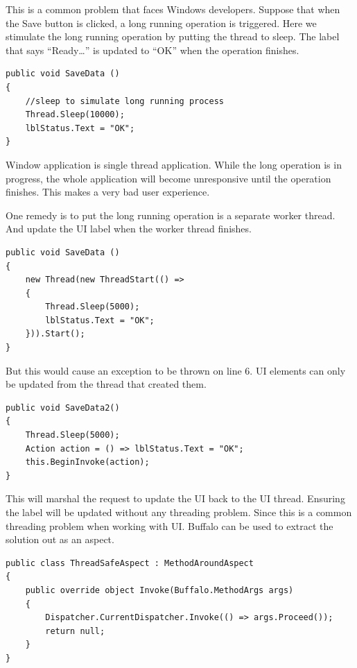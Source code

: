 This is a common problem that faces Windows developers. Suppose that when the Save button is clicked, a long running operation is triggered. Here we stimulate the long running operation by putting the thread to sleep. The label that says “Ready…” is updated to “OK” when the operation finishes.

\begin{lstlisting}[caption={Long running operation}, label=savedata1, frame=tb, basicstyle=\scriptsize]
public void SaveData ()
{
    //sleep to simulate long running process
    Thread.Sleep(10000);
    lblStatus.Text = "OK";
}
\end{lstlisting}

Window application is single thread application. While the long operation is in progress, the whole application will become unresponsive until the operation finishes. This makes a very bad user experience.

One remedy is to put the long running operation is a separate worker thread. And update the UI label when the worker thread finishes.

\begin{lstlisting}[caption={Long running operation with thread}, label=savedata2, frame=tb, basicstyle=\scriptsize]
public void SaveData ()
{
    new Thread(new ThreadStart(() =>
    {
        Thread.Sleep(5000);
        lblStatus.Text = "OK";
    })).Start();
}
\end{lstlisting}

But this would cause an exception to be thrown on line 6. UI elements can only be updated from the thread that created them.

\begin{lstlisting}[caption={Update UI from different thread}, label=savedata3, frame=tb, basicstyle=\scriptsize]
public void SaveData2()
{ 
    Thread.Sleep(5000);
    Action action = () => lblStatus.Text = "OK";
    this.BeginInvoke(action);
}
\end{lstlisting}

This will marshal the request to update the UI back to the UI thread. Ensuring the label will be updated without any threading problem.
Since this is a common threading problem when working with UI. Buffalo can be used to extract the solution out as an aspect.

\begin{lstlisting}[caption={ThreadSafeAspect}, label=savedata4, frame=tb, basicstyle=\scriptsize]
public class ThreadSafeAspect : MethodAroundAspect
{
	public override object Invoke(Buffalo.MethodArgs args)
	{
		Dispatcher.CurrentDispatcher.Invoke(() => args.Proceed());
		return null;
	}
}
\end{lstlisting}

